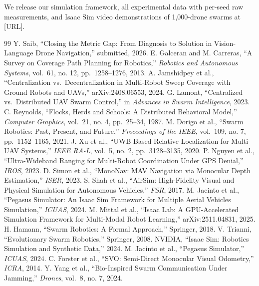 \documentclass[conference]{IEEEtran}
\begin{document}
We release our simulation framework, all experimental data with per-seed
raw measurements, and Isaac Sim video demonstrations of 1,000-drone
swarms at {[}URL{]}.

\begin{thebibliography}{99}
 Y. Saib, ``Closing the Metric Gap: From Diagnosis to Solution in Vision-Language Drone Navigation,'' submitted, 2026.
 E. Galceran and M. Carreras, ``A Survey on Coverage Path Planning for Robotics,'' \emph{Robotics and Autonomous Systems}, vol.~61, no. 12, pp.~1258--1276, 2013.
 A. Jamshidpey et al., ``Centralization vs.~Decentralization in Multi-Robot Sweep Coverage with Ground Robots and UAVs,'' arXiv:2408.06553, 2024.
 G. Lamont, ``Centralized vs.~Distributed UAV Swarm Control,'' in \emph{Advances in Swarm Intelligence}, 2023.
 C. Reynolds, ``Flocks, Herds and Schools: A Distributed Behavioral Model,'' \emph{Computer Graphics}, vol.~21, no. 4, pp.~25--34, 1987.
 M. Dorigo et al., ``Swarm Robotics: Past, Present, and Future,'' \emph{Proceedings of the IEEE}, vol.~109, no. 7, pp.~1152--1165, 2021.
 J. Xu et al., ``UWB-Based Relative Localization for Multi-UAV Systems,'' \emph{IEEE RA-L}, vol.~5, no. 2, pp.~3128--3135, 2020.
 P. Nguyen et al., ``Ultra-Wideband Ranging for Multi-Robot Coordination Under GPS Denial,'' \emph{IROS}, 2023.
 D. Simon et al., ``MonoNav: MAV Navigation via Monocular Depth Estimation,'' \emph{ISER}, 2023.
 S. Shah et al., ``AirSim: High-Fidelity Visual and Physical Simulation for Autonomous Vehicles,'' \emph{FSR}, 2017.
 M. Jacinto et al., ``Pegasus Simulator: An Isaac Sim Framework for Multiple Aerial Vehicles Simulation,'' \emph{ICUAS}, 2024.
 M. Mittal et al., ``Isaac Lab: A GPU-Accelerated Simulation Framework for Multi-Modal Robot Learning,'' arXiv:2511.04831, 2025.
 H. Hamann, ``Swarm Robotics: A Formal Approach,'' Springer, 2018.
 V. Trianni, ``Evolutionary Swarm Robotics,'' Springer, 2008.
 NVIDIA, ``Isaac Sim: Robotics Simulation and Synthetic Data,'' 2024.
 M. Jacinto et al., ``Pegasus Simulator,'' \emph{ICUAS}, 2024.
 C. Forster et al., ``SVO: Semi-Direct Monocular Visual Odometry,'' \emph{ICRA}, 2014.
 Y. Yang et al., ``Bio-Inspired Swarm Communication Under Jamming,'' \emph{Drones}, vol.~8, no. 7, 2024.
\end{thebibliography}
\end{document}
